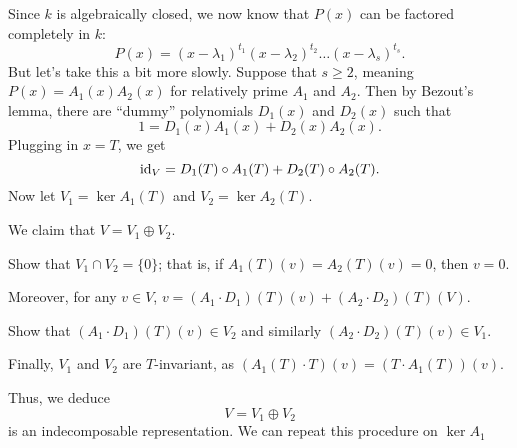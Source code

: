 Since $k$ is algebraically closed, we now know that $P(x)$ can be factored completely in $k$:
\[ P(x) = \left( x - \lambda_1 \right)^{t_1} \left( x - \lambda_2 \right)^{t_2} \dots (x - \lambda_s)^{t_s}. \]
But let's take this a bit more slowly.
Suppose that $s \ge 2$, meaning $P(x) = A_1(x) A_2(x)$ for relatively prime $A_1$ and $A_2$.
Then by Bezout's lemma, there are ``dummy'' polynomials $D_1(x)$ and $D_2(x)$ such that
\[ 1 = D_1(x) A_1(x) + D_2(x) A_2(x). \]
Plugging in $x=T$, we get
\[ \mathrm{id}_V = D_1(T) \circ A_1(T) + D_2(T) \circ A_2(T). \]
Now let $V_1 = \ker A_1(T)$ and $V_2 = \ker A_2(T)$.

We claim that $V = V_1 \oplus V_2$.
\begin{ques}
	Show that $V_1 \cap V_2 = \{0\}$; that is,
	if $A_1(T)(v) = A_2(T)(v) = 0$, then $v=0$.
\end{ques}
Moreover, for any $v \in V$, $v = (A_1 \cdot D_1)(T)(v) + (A_2 \cdot D_2)(T)(V)$.
\begin{ques}
	Show that $(A_1 \cdot D_1)(T)(v) \in V_2$
	and similarly $(A_2 \cdot D_2)(T)(v) \in V_1$.
\end{ques}
Finally, $V_1$ and $V_2$ are $T$-invariant, as $(A_1(T) \cdot T)(v) = (T \cdot A_1(T))(v)$.

Thus, we deduce
\[ V = V_1 \oplus V_2 \]
is an indecomposable representation.
We can repeat this procedure on $\ker A_1$
